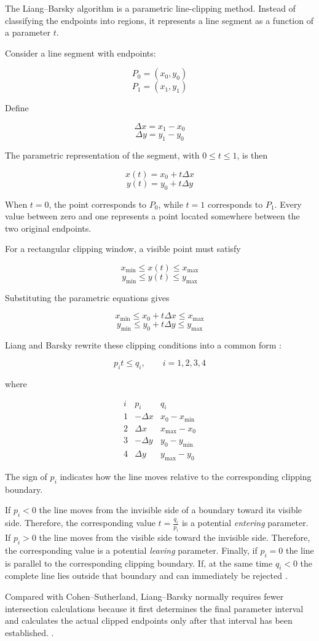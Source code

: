 The Liang--Barsky algorithm is a parametric line-clipping method. Instead of classifying the endpoints into regions, it represents a line segment as a function of a parameter $t$.

Consider a line segment with endpoints:

\[P_0=(x_0,y_0)\]
\[P_1=(x_1,y_1)\]

Define

\[\Delta x=x_1-x_0\]
\[\Delta y=y_1-y_0\]

The parametric representation of the segment, with $0\leq t\leq1$, is then

\[x(t)=x_0+t\Delta x\]
\[y(t)=y_0+t\Delta y\]

When $t=0$, the point corresponds to $P_0$, while $t=1$ corresponds to $P_1$. Every value between zero and one represents a point located somewhere between the two original endpoints.

For a rectangular clipping window, a visible point must satisfy

\[x_{\min}\leq x(t)\leq x_{\max}\]
\[y_{\min}\leq y(t)\leq y_{\max}\]

Substituting the parametric equations gives

\[x_{\min}\leq x_0+t\Delta x\leq x_{\max}\]
\[y_{\min}\leq y_0+t\Delta y\leq y_{\max}\]

Liang and Barsky rewrite these clipping conditions into a common form \cite{LiangBarsky1984}:

\[p_i t \leq q_i, \qquad i=1,2,3,4\]

where

\[
\begin{array}{c|c|c}
i & p_i & q_i \\
\hline
1 & -\Delta x & x_0-x_{\min} \\
2 &  \Delta x & x_{\max}-x_0 \\
3 & -\Delta y & y_0-y_{\min} \\
4 &  \Delta y & y_{\max}-y_0
\end{array}
\]

The sign of $p_i$ indicates how the line moves relative to the corresponding clipping boundary.

If $p_i<0$ the line moves from the invisible side of a boundary toward its visible side. Therefore, the corresponding value $t=\frac{q_i}{p_i}$ is a potential \textit{entering} parameter. If $p_i>0$ the line moves from the visible side toward the invisible side. Therefore, the corresponding value is a potential \textit{leaving} parameter. Finally, if $p_i=0$ the line is parallel to the corresponding clipping boundary. If, at the same time $q_i<0$ the complete line lies outside that boundary and can immediately be rejected \cite{LiangBarsky1984}.

Compared with Cohen--Sutherland, Liang--Barsky normally requires fewer intersection calculations because it first determines the final parameter interval and calculates the actual clipped endpoints only after that interval has been established. \cite{LiangBarsky1984,MatthesDrakopoulos2022}.

